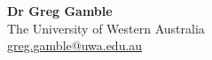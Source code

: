 \documentclass[11pt,a4paper]{article}
\newcommand{\placeholder}[1]{{\color{muted}[#1]}}
\begin{document}
\begin{flushleft}
\textbf{Dr Greg Gamble} \\
The University of Western Australia \\
\href{mailto:greg.gamble@uwa.edu.au}{greg.gamble@uwa.edu.au}
\end{flushleft}

\newpage 

\end{document}

